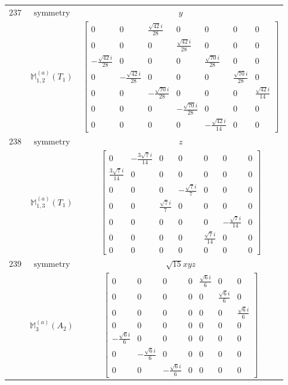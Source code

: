 \documentclass[fleqn,8pt,landscape]{jsarticle}
\begin{document}
\begin{longtable}{ccc}
$ 237 $ & $ \text{symmetry} $ & $ y $ \\
$  $ & $ \mathbb{M}_{1,2}^{(a)}(T_{1}) $ & $ \begin{bmatrix} 0 & 0 & \frac{\sqrt{42} i}{28} & 0 & 0 & 0 & 0 \\ 0 & 0 & 0 & \frac{\sqrt{42} i}{28} & 0 & 0 & 0 \\ - \frac{\sqrt{42} i}{28} & 0 & 0 & 0 & \frac{\sqrt{70} i}{28} & 0 & 0 \\ 0 & - \frac{\sqrt{42} i}{28} & 0 & 0 & 0 & \frac{\sqrt{70} i}{28} & 0 \\ 0 & 0 & - \frac{\sqrt{70} i}{28} & 0 & 0 & 0 & \frac{\sqrt{42} i}{14} \\ 0 & 0 & 0 & - \frac{\sqrt{70} i}{28} & 0 & 0 & 0 \\ 0 & 0 & 0 & 0 & - \frac{\sqrt{42} i}{14} & 0 & 0 \end{bmatrix} $ \\ \hline
$ 238 $ & $ \text{symmetry} $ & $ z $ \\
$  $ & $ \mathbb{M}_{1,3}^{(a)}(T_{1}) $ & $ \begin{bmatrix} 0 & - \frac{3 \sqrt{7} i}{14} & 0 & 0 & 0 & 0 & 0 \\ \frac{3 \sqrt{7} i}{14} & 0 & 0 & 0 & 0 & 0 & 0 \\ 0 & 0 & 0 & - \frac{\sqrt{7} i}{7} & 0 & 0 & 0 \\ 0 & 0 & \frac{\sqrt{7} i}{7} & 0 & 0 & 0 & 0 \\ 0 & 0 & 0 & 0 & 0 & - \frac{\sqrt{7} i}{14} & 0 \\ 0 & 0 & 0 & 0 & \frac{\sqrt{7} i}{14} & 0 & 0 \\ 0 & 0 & 0 & 0 & 0 & 0 & 0 \end{bmatrix} $ \\ \hline
$ 239 $ & $ \text{symmetry} $ & $ \sqrt{15} x y z $ \\
$  $ & $ \mathbb{M}_{3}^{(a)}(A_{2}) $ & $ \begin{bmatrix} 0 & 0 & 0 & 0 & \frac{\sqrt{6} i}{6} & 0 & 0 \\ 0 & 0 & 0 & 0 & 0 & \frac{\sqrt{6} i}{6} & 0 \\ 0 & 0 & 0 & 0 & 0 & 0 & \frac{\sqrt{6} i}{6} \\ 0 & 0 & 0 & 0 & 0 & 0 & 0 \\ - \frac{\sqrt{6} i}{6} & 0 & 0 & 0 & 0 & 0 & 0 \\ 0 & - \frac{\sqrt{6} i}{6} & 0 & 0 & 0 & 0 & 0 \\ 0 & 0 & - \frac{\sqrt{6} i}{6} & 0 & 0 & 0 & 0 \end{bmatrix} $ \\ \hline

\end{longtable}
\end{document}
